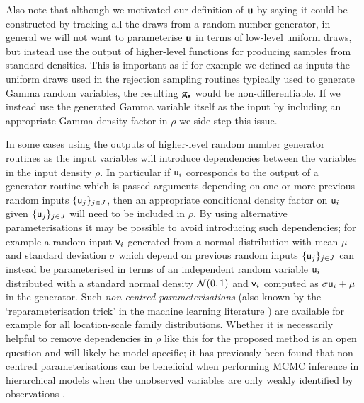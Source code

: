 Also note that although we motivated our definition of $\boldsymbol{\mathsf{u}}$ by saying it could be constructed by tracking all the draws from a random number generator, in general we will not want to parameterise $\boldsymbol{\mathsf{u}}$ in terms of low-level uniform draws, but instead use the output of higher-level functions for producing samples from standard densities. This is important as if for example we defined as inputs the uniform draws used in the rejection sampling routines typically used to generate Gamma random variables, the resulting ${\mathbf{g}}_{\boldsymbol{\mathsf{x}}}$ would be non-differentiable. If we instead use the generated Gamma variable itself as the input by including an appropriate Gamma density factor in $\rho$ we side step this issue. 

In some cases using the outputs of higher-level random number generator routines as the input variables will introduce dependencies between the variables in the input density $\rho$. In particular if $\mathsf{u}_i$ corresponds to the output of a generator routine which is passed arguments depending on one or more previous random inputs $\lbrace \mathsf{u}_j\rbrace_{j\in\mathit{J}}$, then an appropriate conditional density factor on $\mathsf{u}_i$ given $\lbrace \mathsf{u}_j\rbrace_{j\in\mathit{J}}$ will need to be included in $\rho$. By using alternative parameterisations it may be possible to avoid introducing such dependencies; for example a random input $\mathsf{v}_i$ generated from a normal distribution with mean $\mu$ and standard deviation $\sigma$ which depend on previous random inputs $\lbrace \mathsf{u}_j\rbrace_{j\in\mathit{J}}$ can instead be parameterised in terms of an independent random variable $\mathsf{u}_i$ distributed with a standard normal density $\nrm{0,1}$ and $\mathsf{v}_i$ computed as $\sigma \mathsf{u}_i + \mu$ in the generator. Such \emph{non-centred parameterisations} \citep{price1958useful,bonnet1964transformations,papaspiliopoulos2007general} (also known by the `reparameterisation trick' in the machine learning literature \citep{kingma2013auto,rezende2014stochastic}) are available for example for all location-scale family distributions. Whether it is necessarily helpful to remove dependencies in $\rho$ like this for the proposed method is an open question and will likely be model specific; it has previously been found that non-centred parameterisations can be beneficial when performing \ac{MCMC} inference in hierarchical models when the unobserved variables are only weakly identified by observations \citep{papaspiliopoulos2003non,papaspiliopoulos2007general,betancourt2015hamiltonian}.  %

